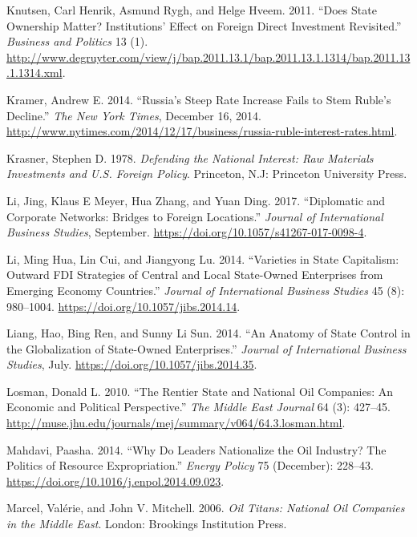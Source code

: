 \documentclass[11pt,]{book}
\begin{document}
\leavevmode\hypertarget{ref-knutsen_does_2011}{}%
Knutsen, Carl Henrik, Asmund Rygh, and Helge Hveem. 2011. ``Does State Ownership Matter? Institutions' Effect on Foreign Direct Investment Revisited.'' \emph{Business and Politics} 13 (1). \url{http://www.degruyter.com/view/j/bap.2011.13.1/bap.2011.13.1.1314/bap.2011.13.1.1314.xml}.

\leavevmode\hypertarget{ref-kramer_russias_2014}{}%
Kramer, Andrew E. 2014. ``Russia's Steep Rate Increase Fails to Stem Ruble's Decline.'' \emph{The New York Times}, December 16, 2014. \url{http://www.nytimes.com/2014/12/17/business/russia-ruble-interest-rates.html}.

\leavevmode\hypertarget{ref-krasner_defending_1978}{}%
Krasner, Stephen D. 1978. \emph{Defending the National Interest: Raw Materials Investments and U.S. Foreign Policy}. Princeton, N.J: Princeton University Press.

\leavevmode\hypertarget{ref-li_diplomatic_2017}{}%
Li, Jing, Klaus E Meyer, Hua Zhang, and Yuan Ding. 2017. ``Diplomatic and Corporate Networks: Bridges to Foreign Locations.'' \emph{Journal of International Business Studies}, September. \url{https://doi.org/10.1057/s41267-017-0098-4}.

\leavevmode\hypertarget{ref-li_varieties_2014}{}%
Li, Ming Hua, Lin Cui, and Jiangyong Lu. 2014. ``Varieties in State Capitalism: Outward FDI Strategies of Central and Local State-Owned Enterprises from Emerging Economy Countries.'' \emph{Journal of International Business Studies} 45 (8): 980--1004. \url{https://doi.org/10.1057/jibs.2014.14}.

\leavevmode\hypertarget{ref-liang_anatomy_2014}{}%
Liang, Hao, Bing Ren, and Sunny Li Sun. 2014. ``An Anatomy of State Control in the Globalization of State-Owned Enterprises.'' \emph{Journal of International Business Studies}, July. \url{https://doi.org/10.1057/jibs.2014.35}.

\leavevmode\hypertarget{ref-losman_rentier_2010}{}%
Losman, Donald L. 2010. ``The Rentier State and National Oil Companies: An Economic and Political Perspective.'' \emph{The Middle East Journal} 64 (3): 427--45. \url{http://muse.jhu.edu/journals/mej/summary/v064/64.3.losman.html}.

\leavevmode\hypertarget{ref-mahdavi_why_2014}{}%
Mahdavi, Paasha. 2014. ``Why Do Leaders Nationalize the Oil Industry? The Politics of Resource Expropriation.'' \emph{Energy Policy} 75 (December): 228--43. \url{https://doi.org/10.1016/j.enpol.2014.09.023}.

\leavevmode\hypertarget{ref-marcel_oil_2006}{}%
Marcel, Valérie, and John V. Mitchell. 2006. \emph{Oil Titans: National Oil Companies in the Middle East}. London: Brookings Institution Press.
\end{document}
